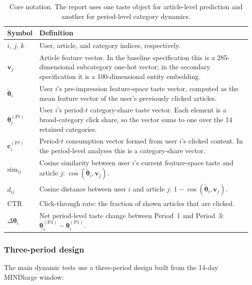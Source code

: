 \documentclass[11pt]{article}
\begin{document}
\begin{table}[ht]
\centering
\caption{Core notation. The report uses one taste object for article-level prediction and another for period-level category dynamics.}
\label{tab:notation}
\begin{tabularx}{\textwidth}{>{\raggedright\arraybackslash}p{}Y}
\toprule
Symbol & Definition \\
\midrule
$i$, $j$, $k$ & User, article, and category indices, respectively. \\
$\mathbf{v}_j$ & Article feature vector. In the baseline specification this is a 285-dimensional subcategory one-hot vector; in the secondary specification it is a 100-dimensional entity embedding. \\
$\tilde{\boldsymbol{\theta}}_i$ & User $i$'s pre-impression feature-space taste vector, computed as the mean feature vector of the user's previously clicked articles. \\
$\boldsymbol{\theta}_i^{(\mathrm{P}t)}$ & User $i$'s period-$t$ category-share taste vector. Each element is a broad-category click share, so the vector sums to one over the 14 retained categories. \\
$\mathbf{c}_i^{(\mathrm{P}t)}$ & Period-$t$ consumption vector formed from user $i$'s clicked content. In the period-level analyses this is a category-share vector. \\
$\text{sim}_{ij}$ & Cosine similarity between user $i$'s current feature-space taste and article $j$: $\cos(\tilde{\boldsymbol{\theta}}_i,\mathbf{v}_j)$. \\
$d_{ij}$ & Cosine distance between user $i$ and article $j$: $1-\cos(\tilde{\boldsymbol{\theta}}_i,\mathbf{v}_j)$. \\
CTR & Click-through rate: the fraction of shown articles that are clicked. \\
$\Delta\boldsymbol{\theta}_i$ & Net period-level taste change between Period~1 and Period~3: $\boldsymbol{\theta}_i^{(\mathrm{P3})} - \boldsymbol{\theta}_i^{(\mathrm{P1})}$. \\
\bottomrule
\end{tabularx}
\end{table}
\FloatBarrier

\subsubsection{Three-period design}
\label{sec:three_period_design}

The main dynamic tests use a three-period design built from the 14-day MINDlarge window:
\end{document}
